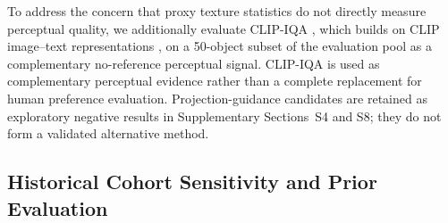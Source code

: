 \documentclass[times,twocolumn,final]{elsarticle}
\providecommand{\DIFadd}[1]{{\protect\color{blue} \sf #1}} %
\providecommand{\DIFdel}[1]{{\protect\color{red} \scriptsize #1}} %
\providecommand{\DIFaddbegin}{} %
\providecommand{\DIFaddend}{} %
\providecommand{\DIFdelbegin}{} %
\providecommand{\DIFdelend}{} %
\begin{document}
\DIFdelbegin %
\DIFdel{To address the concern that proxy texture statistics do not directly measure perceptual quality, we additionally evaluate CLIP-IQA \cite{wang2023clipiqa}, which builds on CLIP image--text representations \cite{radford2021clip}, on a 50-object subset of the evaluation pool as a complementary no-reference perceptual signal. CLIP-IQA is used as complementary perceptual evidence rather than a complete replacement for human preference evaluation.
}\DIFdelend \DIFaddbegin \DIFadd{Projection-guidance candidates are retained as exploratory negative results in Supplementary Sections~S4 and S8; they do not form a validated alternative method.
}\DIFaddend 

\DIFdelbegin %
\DIFdelend \DIFaddbegin \subsection{Historical Cohort Sensitivity and Prior Evaluation}
\label{subsec:original276}
\DIFaddend 
\end{document}
